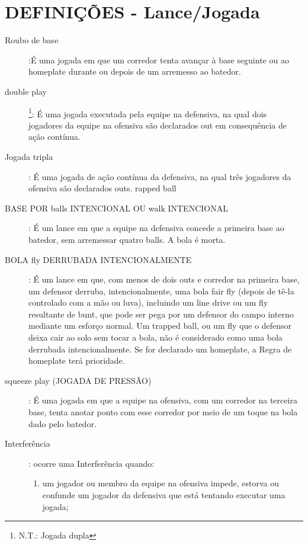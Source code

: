 	\section{DEFINI\c{C}\~OES - Lance/Jogada}
	\begin{description}	
	\item[Roubo de base]:\'E uma jogada em que um corredor tenta avan\c{c}ar \`a base seguinte ou ao \gls{homeplate} durante ou depois de um arremesso ao batedor. 

	\item[\Gls{double play}]\footnote{N.T.: Jogada dupla}: \'E uma jogada executada pela equipe na defensiva, na qual dois jogadores da equipe na ofensiva s\~ao declarados \gls{out} em consequ\^encia de a\c{c}\~ao cont\'inua. 		
	
	\item[Jogada tripla]: \'E uma jogada de a\c{c}\~ao cont\'inua da defensiva, na qual tr\^es jogadores da ofensiva s\~ao declarados \gls{out}s. rapped ball
	\item[BASE POR \glspl{ball} INTENCIONAL OU \gls{walk} INTENCIONAL]:
	\'E um lance em que a equipe na defensiva concede a primeira base ao batedor, sem arremessar quatro \glspl{ball}. A bola \'e morta. 
	
	\item[BOLA \gls{fly} DERRUBADA INTENCIONALMENTE]: \'E um lance em que, com menos de dois \glspl{out} e corredor na primeira base, um defensor derruba, intencionalmente, uma bola \gls{fair fly} (depois de t\^e-la controlado com a m\~ao ou luva), incluindo um \gls{line drive} ou um \gls{fly} resultante de \gls{bunt}, que pode ser pega por um defensor do campo interno mediante um esfor\c{c}o normal. Um \gls{trapped ball}, ou um \gls{fly} que o defensor deixa cair ao solo sem tocar a bola, n\~ao \'e considerado como uma bola derrubada intencionalmente. Se for declarado um \gls{homeplate}, a Regra de \gls{homeplate} ter\'a prioridade. 
	
	\item[\gls{squeeze play} (JOGADA DE PRESS\~AO)]: \'E uma jogada em que a equipe na ofensiva, com um corredor na terceira base, tenta anotar ponto com esse corredor por meio de um toque na bola dado pelo batedor. 

	
	\item[Interfer\^encia]:	ocorre uma Interfer\^encia quando: 
	\begin{enumerate}[label=\alph*)]
		\item um jogador ou membro da equipe na ofensiva impede, estorva ou confunde um jogador da defensiva que est\'a tentando executar uma jogada; 
		

\end{enumerate}
\end{description}
